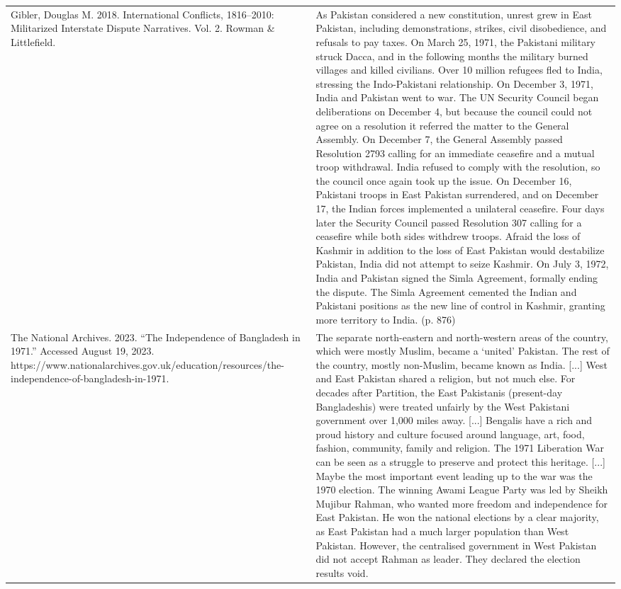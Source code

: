 {\begin{longtable}{p{}p{}}
Gibler, Douglas M. 2018. International Conflicts, 1816–2010: Militarized Interstate Dispute Narratives. Vol. 2. Rowman \& Littlefield. & As Pakistan considered a new constitution, unrest grew in East Pakistan, including demonstrations, strikes, civil disobedience, and refusals to pay taxes. On March 25, 1971, the Pakistani military struck Dacca, and in the following months the military burned villages and killed civilians. Over 10 million refugees fled to India, stressing the Indo-Pakistani relationship. On December 3, 1971, India and Pakistan went to war. The UN Security Council began deliberations on December 4, but because the council could not agree on a resolution it referred the matter to the General Assembly. On December 7, the General Assembly passed Resolution 2793 calling for an immediate ceasefire and a mutual troop withdrawal. India refused to comply with the resolution, so the council once again took up the issue. On December 16, Pakistani troops in East Pakistan surrendered, and on December 17, the Indian forces implemented a unilateral ceasefire. Four days later the Security Council passed Resolution 307 calling for a ceasefire while both sides withdrew troops. Afraid the loss of Kashmir in addition to the loss of East Pakistan would destabilize Pakistan, India did not attempt to seize Kashmir. On July 3, 1972, India and Pakistan signed the Simla Agreement, formally ending the dispute. The Simla Agreement cemented the Indian and Pakistani positions as the new line of control in Kashmir, granting more territory to India. (p. 876)
\\
The National Archives. 2023. “The Independence of Bangladesh in 1971.” Accessed August 19, 2023. https://www.nationalarchives.gov.uk/education/resources/the-independence-of-bangladesh-in-1971. & The separate north-eastern and north-western areas of the country, which were mostly Muslim, became a ‘united' Pakistan. The rest of the country, mostly non-Muslim, became known as India. [...] West and East Pakistan shared a religion, but not much else. For decades after Partition, the East Pakistanis (present-day Bangladeshis) were treated unfairly by the West Pakistani government over 1,000 miles away. [...] Bengalis have a rich and proud history and culture focused around language, art, food, fashion, community, family and religion. The 1971 Liberation War can be seen as a struggle to preserve and protect this heritage. [...] Maybe the most important event leading up to the war was the 1970 election. The winning Awami League Party was led by Sheikh Mujibur Rahman, who wanted more freedom and independence for East Pakistan. He won the national elections by a clear majority, as East Pakistan had a much larger population than West Pakistan. However, the centralised government in West Pakistan did not accept Rahman as leader. They declared the election results void. 

\end{longtable}}
